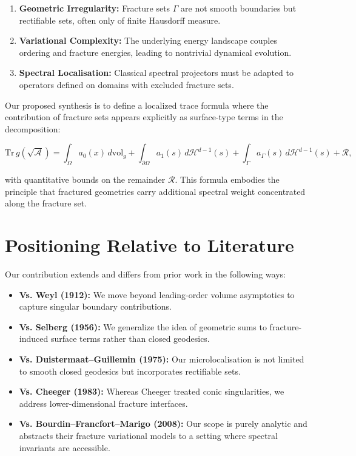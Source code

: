 \begin{enumerate}[label=(\alph*)]
\item \textbf{Geometric Irregularity:} Fracture sets $\Gamma$ are not smooth
boundaries but rectifiable sets, often only of finite Hausdorff measure.
\item \textbf{Variational Complexity:} The underlying energy landscape couples
ordering and fracture energies, leading to nontrivial dynamical evolution.
\item \textbf{Spectral Localisation:} Classical spectral projectors must be adapted to
operators defined on domains with excluded fracture sets.
\end{enumerate}

Our proposed synthesis is to define a localized trace formula where the contribution
of fracture sets appears explicitly as surface-type terms in the decomposition:

\[
\mathrm{Tr}\,g(\sqrt{\mathcal{A}}) = 
\int_\Omega a_0(x)\,d\mathrm{vol}_g +
\int_{\partial\Omega} a_1(s)\,d\mathcal{H}^{d-1}(s) +
\int_{\Gamma} a_\Gamma(s)\,d\mathcal{H}^{d-1}(s) +
\mathcal{R},
\]

with quantitative bounds on the remainder $\mathcal{R}$. This formula embodies the
principle that fractured geometries carry additional spectral weight concentrated
along the fracture set.


\section{Positioning Relative to Literature}

Our contribution extends and differs from prior work in the following ways:

\begin{itemize}
\item \textbf{Vs. Weyl (1912):} We move beyond leading-order volume asymptotics to
capture singular boundary contributions.
\item \textbf{Vs. Selberg (1956):} We generalize the idea of geometric sums to
fracture-induced surface terms rather than closed geodesics.
\item \textbf{Vs. Duistermaat–Guillemin (1975):} Our microlocalisation is not limited
to smooth closed geodesics but incorporates rectifiable sets.
\item \textbf{Vs. Cheeger (1983):} Whereas Cheeger treated conic singularities, we
address lower-dimensional fracture interfaces.
\item \textbf{Vs. Bourdin–Francfort–Marigo (2008):} Our scope is purely analytic and
abstracts their fracture variational models to a setting where spectral invariants are
accessible.
\end{itemize}

